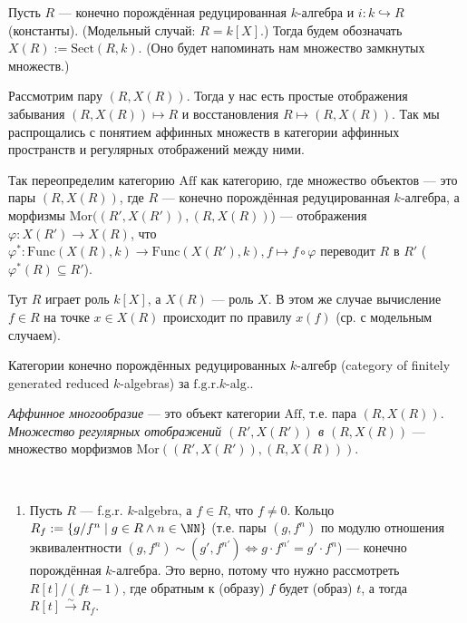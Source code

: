 \documentclass[12pt,a4paper]{article}
\newcommand{\Func}{\mathrm{Func}}
\newcommand{\Aff}{\mathrm{Aff}}
\newcommand{\Mor}{\mathrm{Mor}}
\newcommand{\Sect}{\mathrm{Sect}}
\newcommand{\fgrkalg}[1][k]{\text{f.g.r.$#1$-alg.}}
\begin{document}
    \begin{definition}
        Пусть $R$ --- конечно порождённая редуцированная $k$-алгебра и $i: k \hookrightarrow R$ (константы). (Модельный случай: $R = k[X]$.) Тогда будем обозначать $X(R) := \Sect(R, k)$. (Оно будет напоминать нам множество замкнутых множеств.)

        Рассмотрим пару $(R, X(R))$. Тогда у нас есть простые отображения забывания $(R, X(R)) \mapsto R$ и восстановления $R \mapsto (R, X(R))$. Так мы распрощались с понятием аффинных множеств в категории аффинных пространств и регулярных отображений между ними.

        Так переопределим категорию $\Aff$ как категорию, где множество объектов --- это пары $(R, X(R))$, где $R$ --- конечно порождённая редуцированная $k$-алгебра, а морфизмы $\Mor((R', X(R')), (R, X(R))$) --- отображения $\varphi: X(R') \to X(R)$, что $\varphi^*: \Func(X(R), k) \to \Func(X(R'), k), f \mapsto f \circ \varphi$ переводит $R$ в $R'$ ($\varphi^*(R) \subseteq R'$).

        Тут $R$ играет роль $k[X]$, а $X(R)$ --- роль $X$. В этом же случае вычисление $f \in R$ на точке $x \in X(R)$ происходит по правилу $x(f)$ (ср. с модельным случаем).

        Категории конечно порождённых редуцированных $k$-алгебр (category of finitely generated reduced $k$-algebras) за $\fgrkalg$.
    \end{definition}

    \begin{definition}
        \emph{Аффинное многообразие} --- это объект категории $\Aff$, т.е. пара $(R, X(R))$. \emph{Множество регулярных отображений $(R', X(R'))$ в $(R, X(R))$} --- множество морфизмов $\Mor((R', X(R')), (R, X(R)))$.
    \end{definition}

    \begin{example}[нетривиальные]\ 
        \begin{enumerate}
            \item Пусть $R$ --- f.g.r. $k$-algebra, а $f \in R$, что $f \neq 0$. Кольцо $R_f := \{g/f^n \mid g \in R \wedge n \in \NN\}$ (т.е. пары $(g, f^n)$ по модулю отношения эквивалентности $(g, f^n) \sim (g', f^{n'}) \Leftrightarrow g \cdot f^{n'} = g' \cdot f^n$) --- конечно порождённая $k$-алгебра. Это верно, потому что нужно рассмотреть $R[t]/(ft - 1)$, где обратным к (образу) $f$ будет (образ) $t$, а тогда $R[t] \overset{\sim}{\to} R_f$.
        \end{enumerate}
    \end{example}
\end{document}
